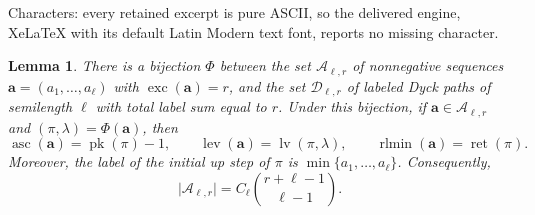 \documentclass[10pt,a4paper]{amsart}
\newtheorem{lemma}[theorem]{Lemma}
\DeclareMathOperator{\asc}{asc}
\DeclareMathOperator{\lev}{lev}
\DeclareMathOperator{\lv}{lv}
\DeclareMathOperator{\pk}{pk}
\DeclareMathOperator{\ret}{ret}
\DeclareMathOperator{\rlmin}{rlmin}
\begin{document}
Characters: every retained excerpt is pure ASCII, so the delivered engine, XeLaTeX with its default Latin Modern text font, reports no missing character.
\begin{lemma}\label{lem:decorated-Dyck}
There is a bijection $\Phi$ between the set $\mathcal{A}_{\ell,r}$ of nonnegative sequences $\mathbf a=(a_1,\ldots, a_\ell)$ with  $\operatorname{exc}(\mathbf a)=r$, and the set $\mathcal{D}_{\ell,r}$ of labeled  Dyck paths of
semilength $\ell$ with total label sum equal to $r$.  Under this bijection, if $\mathbf{a}\in\mathcal{A}_{\ell,r}$ and $(\pi,\lambda)=\Phi(\mathbf a)$, then
\[
\asc(\mathbf{a})=\pk(\pi)-1,
\qquad
\lev(\mathbf{a})=\lv(\pi,\lambda),
\qquad
\rlmin(\mathbf{a})=\ret(\pi).
\]
Moreover, the label of the initial up step of $\pi$ is $\min\{a_1,\ldots,a_\ell\}$.  Consequently, 
\[
\lvert\mathcal{A}_{\ell,r}\rvert
=
C_\ell\binom{r+\ell-1}{\ell-1}.
\]
\end{lemma}
\end{document}
